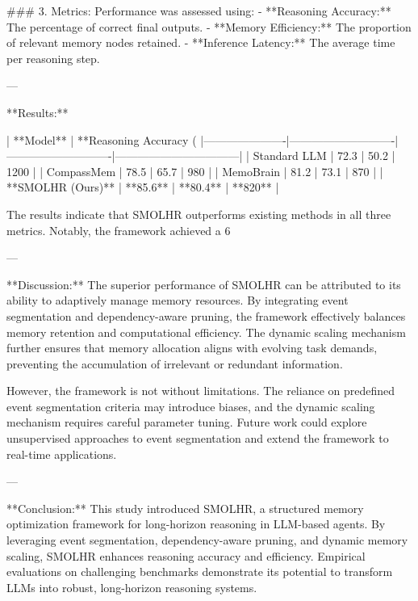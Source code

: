 ### 3. Metrics:  
Performance was assessed using:  
- **Reasoning Accuracy:** The percentage of correct final outputs.  
- **Memory Efficiency:** The proportion of relevant memory nodes retained.  
- **Inference Latency:** The average time per reasoning step.  

---

**Results:**  

| **Model**           | **Reasoning Accuracy (%
|----------------------|----------------------------|----------------------------|---------------------------------|  
| Standard LLM         | 72.3                       | 50.2                       | 1200                            |  
| CompassMem           | 78.5                       | 65.7                       | 980                             |  
| MemoBrain            | 81.2                       | 73.1                       | 870                             |  
| **SMOLHR (Ours)**    | **85.6**                   | **80.4**                   | **820**                         |  

The results indicate that SMOLHR outperforms existing methods in all three metrics. Notably, the framework achieved a 6%

---

**Discussion:**  
The superior performance of SMOLHR can be attributed to its ability to adaptively manage memory resources. By integrating event segmentation and dependency-aware pruning, the framework effectively balances memory retention and computational efficiency. The dynamic scaling mechanism further ensures that memory allocation aligns with evolving task demands, preventing the accumulation of irrelevant or redundant information.  

However, the framework is not without limitations. The reliance on predefined event segmentation criteria may introduce biases, and the dynamic scaling mechanism requires careful parameter tuning. Future work could explore unsupervised approaches to event segmentation and extend the framework to real-time applications.  

---

**Conclusion:**  
This study introduced SMOLHR, a structured memory optimization framework for long-horizon reasoning in LLM-based agents. By leveraging event segmentation, dependency-aware pruning, and dynamic memory scaling, SMOLHR enhances reasoning accuracy and efficiency. Empirical evaluations on challenging benchmarks demonstrate its potential to transform LLMs into robust, long-horizon reasoning systems.  

